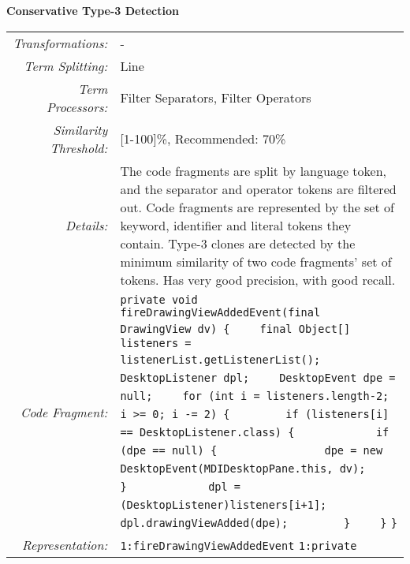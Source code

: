 \documentclass[]{article}
\begin{document}
	\noindent\begin{minipage}{\textwidth}
		\noindent \textbf{Conservative Type-3 Detection}\\
		\begin{tabular}{rp{12.5cm}}
			\bottomrule[2pt]
			\textit{Transformations:} & - \\
			\textit{Term Splitting:}  & Line\\
			\textit{Term Processors:} & Filter Separators, Filter Operators \\
			\textit{Similarity Threshold:} & [1-100]\%, Recommended: 70\% \\
			\midrule
			\textit{Details:}         & The code fragments are split by language token, and the separator and operator tokens are filtered out.  Code fragments are represented by the set of keyword, identifier and literal tokens they contain.  Type-3 clones are detected by the minimum similarity of two code fragments' set of tokens.  Has very good precision, with good recall.\\
			\midrule
			\textit{Code Fragment:} &
			\verb|private void fireDrawingViewAddedEvent(final DrawingView dv) {|\newline
			\verb|    final Object[] listeners = listenerList.getListenerList();|\newline
			\verb|    DesktopListener dpl;|\newline
			\verb|    DesktopEvent dpe = null;|\newline
			\verb|    for (int i = listeners.length-2; i >= 0; i -= 2) {|\newline
			\verb|        if (listeners[i] == DesktopListener.class) {|\newline
			\verb|            if (dpe == null) {|\newline
			\verb|                dpe = new DesktopEvent(MDIDesktopPane.this, dv);|\newline
			\verb|            }|\newline
			\verb|            dpl = (DesktopListener)listeners[i+1];|\newline
			\verb|            dpl.drawingViewAdded(dpe);|\newline
			\verb|        }|\newline
			\verb|    }|\newline
			\verb|}|\newline
			\\
			\textit{Representation:} & 
	        \verb|1:fireDrawingViewAddedEvent|\newline
	        \verb|1:private|\newline

\end{tabular}
\end{minipage}
\end{document}
